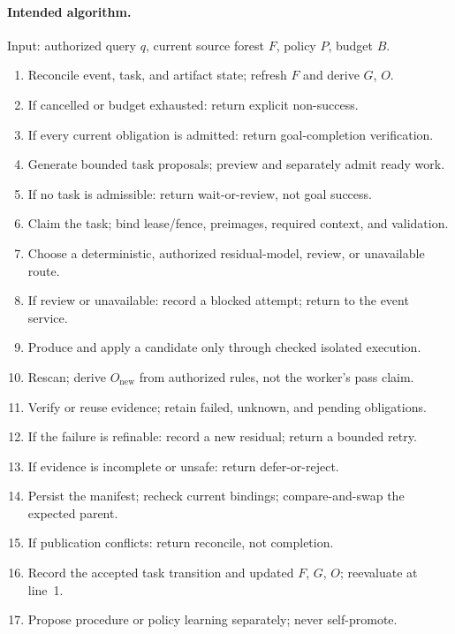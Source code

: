 \paragraph{Intended algorithm.}
Input: authorized query $q$, current source forest $F$, policy $P$, budget $B$.
\begin{enumerate}
\item Reconcile event, task, and artifact state; refresh $F$ and derive $G$, $O$.
\item If cancelled or budget exhausted: return explicit non-success.
\item If every current obligation is admitted: return goal-completion verification.
\item Generate bounded task proposals; preview and separately admit ready work.
\item If no task is admissible: return wait-or-review, not goal success.
\item Claim the task; bind lease/fence, preimages, required context, and validation.
\item Choose a deterministic, authorized residual-model, review, or unavailable route.
\item If review or unavailable: record a blocked attempt; return to the event service.
\item Produce and apply a candidate only through checked isolated execution.
\item Rescan; derive $O_{\mathrm{new}}$ from authorized rules, not the worker's pass claim.
\item Verify or reuse evidence; retain failed, unknown, and pending obligations.
\item If the failure is refinable: record a new residual; return a bounded retry.
\item If evidence is incomplete or unsafe: return defer-or-reject.
\item Persist the manifest; recheck current bindings; compare-and-swap the expected parent.
\item If publication conflicts: return reconcile, not completion.
\item Record the accepted task transition and updated $F$, $G$, $O$; reevaluate at line~1.
\item Propose procedure or policy learning separately; never self-promote.
\end{enumerate}

